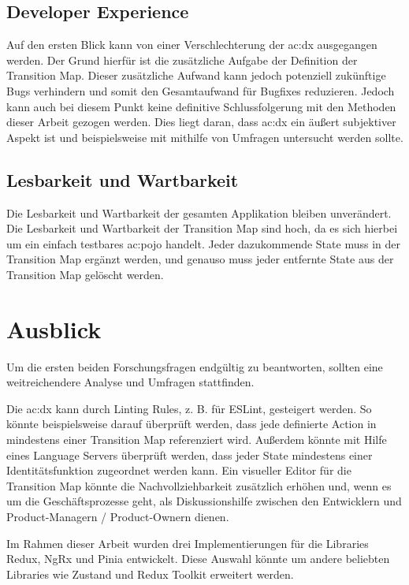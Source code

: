 \subsection{Developer Experience}

Auf den ersten Blick kann von einer Verschlechterung der \acrshort{ac:dx} ausgegangen werden. Der Grund hierfür ist die zusätzliche Aufgabe der Definition der Transition Map. Dieser zusätzliche Aufwand kann jedoch potenziell zukünftige Bugs verhindern und somit den Gesamtaufwand für Bugfixes reduzieren. Jedoch kann auch bei diesem Punkt keine definitive Schlussfolgerung mit den Methoden dieser Arbeit gezogen werden. Dies liegt daran, dass \acrlong{ac:dx} ein äußert subjektiver Aspekt ist und beispielsweise mit mithilfe von Umfragen untersucht werden sollte.

\subsection{Lesbarkeit und Wartbarkeit}

Die Lesbarkeit und Wartbarkeit der gesamten Applikation bleiben unverändert. Die Lesbarkeit und Wartbarkeit der Transition Map sind hoch, da es sich hierbei um ein einfach testbares \acrshort{ac:pojo} handelt. Jeder dazukommende State muss in der Transition Map ergänzt werden, und genauso muss jeder entfernte State aus der Transition Map gelöscht werden.


\section{Ausblick}

Um die ersten beiden Forschungsfragen endgültig zu beantworten, sollten eine weitreichendere Analyse und Umfragen stattfinden.

Die \acrshort{ac:dx} kann durch Linting Rules, z. B. für ESLint, gesteigert werden. So könnte beispielsweise darauf überprüft werden, dass jede definierte Action in mindestens einer Transition Map referenziert wird. Außerdem könnte mit Hilfe eines Language Servers überprüft werden, dass jeder State mindestens einer Identitätsfunktion zugeordnet werden kann. Ein visueller Editor für die Transition Map könnte die Nachvollziehbarkeit zusätzlich erhöhen und, wenn es um die Geschäftsprozesse geht, als Diskussionshilfe zwischen den Entwicklern und Product-Managern / Product-Ownern dienen.

Im Rahmen dieser Arbeit wurden drei Implementierungen für die Libraries Redux, NgRx und Pinia entwickelt. Diese Auswahl könnte um andere beliebten Libraries wie Zustand und Redux Toolkit erweitert werden.
